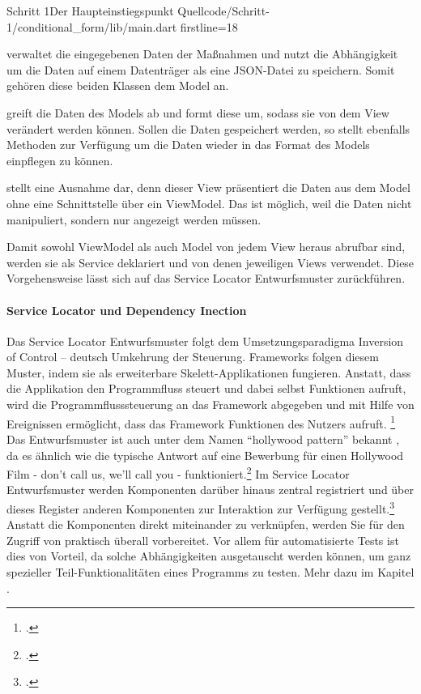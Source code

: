 {\begin{alexlisting}{Schritt 1}{Der Haupteinstiegspunkt}
  {Quellcode/Schritt-1/conditional_form/lib/main.dart}
  {firstline=18}
  \label{lst:Schritt1DerHaupteinstiegspunkt}
\end{alexlisting}

  verwaltet die eingegebenen Daten der Maßnahmen und nutzt die Abhängigkeit   um die Daten auf einem Datenträger als eine JSON-Datei zu speichern. Somit gehören diese beiden Klassen dem Model an.

  greift die Daten des Models ab und formt diese um, sodass sie von dem View   verändert werden können. Sollen die Daten gespeichert werden, so stellt  ebenfalls Methoden zur Verfügung um die Daten wieder in das Format des Models einpflegen zu können.

  stellt eine Ausnahme dar, denn dieser View präsentiert die Daten aus dem Model ohne eine Schnittstelle über ein ViewModel. Das ist möglich, weil die Daten nicht manipuliert, sondern nur angezeigt werden müssen.

Damit sowohl ViewModel als auch Model von jedem View heraus abrufbar sind, werden sie als Service deklariert und von denen jeweiligen Views verwendet. Diese Vorgehensweise lässt sich auf das Service Locator Entwurfsmuster zurückführen.


\paragraph{Service Locator und Dependency Inection}

Das Service Locator Entwurfsmuster folgt dem Umsetzungsparadigma Inversion of Control – deutsch Umkehrung der Steuerung. Frameworks folgen diesem Muster, indem sie als erweiterbare Skelett-Applikationen fungieren. Anstatt, dass die Applikation den Programmfluss steuert und dabei selbst Funktionen aufruft, wird die Programmflusssteuerung an das Framework abgegeben und mit Hilfe von Ereignissen ermöglicht, dass das Framework Funktionen des Nutzers aufruft. \footcite[Vgl.][]{johnson1988designing}
Das Entwurfsmuster ist auch unter dem Namen \enquote{hollywood pattern} bekannt , da es ähnlich wie die typische Antwort auf eine Bewerbung für einen Hollywood Film - don’t call us, we’ll call you - funktioniert.\footcite[Vgl.][]{fowler2005InversionOfControl}
Im Service Locator Entwurfsmuster werden Komponenten darüber hinaus zentral registriert und über dieses Register anderen Komponenten zur Interaktion zur Verfügung gestellt.\footcite[Vgl.][]{fowler2004DependencyInjection}
Anstatt die Komponenten direkt miteinander zu verknüpfen, werden Sie für den Zugriff von praktisch überall vorbereitet. Vor allem für automatisierte Tests ist dies von Vorteil, da solche Abhängigkeiten ausgetauscht werden können, um ganz spezieller Teil-Funktionalitäten eines Programms zu testen.  Mehr dazu im Kapitel .

}
